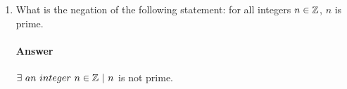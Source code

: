 \documentclass{article}
\begin{document}
\begin{enumerate}
	      \paragraph{Answer}
          \begin{proof}
	      For every integer $k \geq 1$, the complete graph on
	      $n$ vertices (denoted by the symbol~$K_n$) has $\frac{n(n-1)}{2}$~edges.
	      For each new vertex added, an edge will be connected to each existing vertex.
	      In other words, for the $n^{th}$ vertex added $n-1$ edges are added. $\frac{n(n-1)}{2}$
	      can be rewritten as $\sum^{n-1}_{k=0} k$

	      {\bf Basis:} $f(1)$ = $\frac{1 (1-1)}{2}$
	      $=\frac{1(0)}{2}$
	      $=0$

	      A graph with 1 vertex has zero edges, so this is true.

          {\bf Inductuve Step: } let $k \in \mathbb{Z}\ \|\ k_{0} = 1$ suppose that f (k) is true,
          we will show that f (k+1) is also true.

          \begin{gather*}
           \sum^{(k+1)-1}_{j=0} j = ( \sum^{k-1}_{j=0} j ) + k\\
          = \frac{k(k-1)}{2} + k\\
          = \frac{k(k-1)}{2} + \frac{2k}{2}\\
          = \frac{k^2 -k + 2k}{2}\\
          = \frac{k^2 + k}{2}
          \end{gather*}

          The other side of the equation is

          \[
              \frac{(k+1)((k+1)-1)}{2} = \frac{k^2 +k}{2}

          \]

          $\therefore f(k+1)$ is true


      \end{proof}

	\item What is the negation of the following statement: for all integers $n
		      \in {\mathbb Z}$, $n$ is prime.

	      \paragraph{Answer}
	      $\exists\ an\ integer\ n \in \Z\ |\ n$ is not prime.

\end{enumerate}
\end{document}
